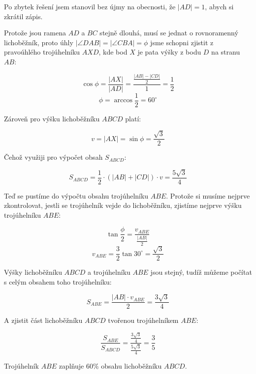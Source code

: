 \documentclass{fkssolpub}
\author{Ondřej Sedláček}
\begin{document}
Po zbytek řešení jsem stanovil bez újmy na obecnosti, že $|AD| = 1$, abych
si zkrátil zápis.

Protože jsou ramena $AD$ a $BC$ stejně dlouhá, musí se jednat o rovnoramenný
lichoběžník, proto úhly $|\angle DAB| = |\angle CBA| = \phi$ jsme schopni zjistit z pravoúhlého trojúhelníku
$AXD$, kde bod $X$ je pata výšky z bodu $D$ na stranu $AB$:

\[
	\cos \phi = \frac{|AX|}{|AD|} = \frac{\frac{|AB| - |CD|}{2}}{1} = \frac{1}{2}
\]
\[
	\phi = \arccos \frac{1}{2} = 60^{\circ}
\]

Zároveň pro výšku lichoběžníku $ABCD$ platí:

\[
	v = |AX| = \sin \phi = \frac{\sqrt{3}}{2}
\]

Čehož využiji pro výpočet obsah $S_{ABCD}$:

\[
	S_{ABCD} = \frac{1}{2} \cdot (|AB| + |CD|) \cdot v = \frac{5 \sqrt{3}}{4}
\]

Teď se pustíme do výpočtu obsahu trojúhelníku $ABE$. Protože si musíme nejprve
zkontrolovat, jestli se trojúhelník vejde do lichoběžníku, zjistíme nejprve
výšku trojúhelníku $ABE$:

\[
	\tan \frac{\phi}{2} = \frac{v_{ABE}}{\frac{|AB|}{2}}
\]
\[
	v_{ABE} = \frac{3}{2} \tan 30^{\circ} = \frac{\sqrt{3}}{2}
\]

Výšky lichoběžníku $ABCD$ a trojúhelníku $ABE$ jsou stejný, tudíž můžeme počítat
s celým obsahem toho trojúhelníku:

\[
	S_{ABE} = \frac{|AB| \cdot v_{ABE}}{2} = \frac{3 \sqrt{3}}{4}
\]

A zjistit část lichoběžníku $ABCD$ tvořenou trojúhelníkem $ABE$:

\[
	\frac{S_{ABE}}{S_{ABCD}} = \frac{\frac{3 \sqrt{3}}{4}}{\frac{5 \sqrt{3}}{4}}
	= \frac{3}{5}
\]

Trojúhelník $ABE$ zaplňuje 60\% obsahu lichoběžníku $ABCD$.
\end{document}
